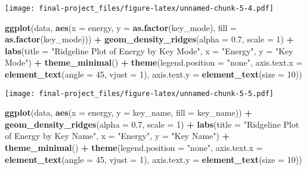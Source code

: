 \documentclass[
]{article}
\newenvironment{Shaded}{\begin{snugshade}}{\end{snugshade}}
\newcommand{\AttributeTok}[1]{\textcolor[rgb]{0.13,0.29,0.53}{#1}}
\newcommand{\DecValTok}[1]{\textcolor[rgb]{0.00,0.00,0.81}{#1}}
\newcommand{\FloatTok}[1]{\textcolor[rgb]{0.00,0.00,0.81}{#1}}
\newcommand{\FunctionTok}[1]{\textcolor[rgb]{0.13,0.29,0.53}{\textbf{#1}}}
\newcommand{\NormalTok}[1]{#1}
\newcommand{\SpecialCharTok}[1]{\textcolor[rgb]{0.81,0.36,0.00}{\textbf{#1}}}
\newcommand{\StringTok}[1]{\textcolor[rgb]{0.31,0.60,0.02}{#1}}
\begin{document}
\texttt{[image: final-project\_files/figure-latex/unnamed-chunk-5-4.pdf]}

\begin{Shaded}
\begin{Highlighting}[]
\FunctionTok{ggplot}\NormalTok{(data, }\FunctionTok{aes}\NormalTok{(}\AttributeTok{x =}\NormalTok{ energy, }\AttributeTok{y =} \FunctionTok{as.factor}\NormalTok{(key\_mode), }\AttributeTok{fill =} \FunctionTok{as.factor}\NormalTok{(key\_mode))) }\SpecialCharTok{+}
  \FunctionTok{geom\_density\_ridges}\NormalTok{(}\AttributeTok{alpha =} \FloatTok{0.7}\NormalTok{, }\AttributeTok{scale =} \DecValTok{1}\NormalTok{) }\SpecialCharTok{+}
  \FunctionTok{labs}\NormalTok{(}\AttributeTok{title =} \StringTok{"Ridgeline Plot of Energy by Key Mode"}\NormalTok{,}
       \AttributeTok{x =} \StringTok{"Energy"}\NormalTok{,}
       \AttributeTok{y =} \StringTok{"Key Mode"}\NormalTok{) }\SpecialCharTok{+}
  \FunctionTok{theme\_minimal}\NormalTok{() }\SpecialCharTok{+}
  \FunctionTok{theme}\NormalTok{(}\AttributeTok{legend.position =} \StringTok{"none"}\NormalTok{, }
        \AttributeTok{axis.text.x =} \FunctionTok{element\_text}\NormalTok{(}\AttributeTok{angle =} \DecValTok{45}\NormalTok{, }\AttributeTok{vjust =} \DecValTok{1}\NormalTok{),}
        \AttributeTok{axis.text.y =} \FunctionTok{element\_text}\NormalTok{(}\AttributeTok{size =} \DecValTok{10}\NormalTok{))}
\end{Highlighting}
\end{Shaded}

\texttt{[image: final-project\_files/figure-latex/unnamed-chunk-5-5.pdf]}

\begin{Shaded}
\begin{Highlighting}[]
\FunctionTok{ggplot}\NormalTok{(data, }\FunctionTok{aes}\NormalTok{(}\AttributeTok{x =}\NormalTok{ energy, }\AttributeTok{y =}\NormalTok{ key\_name, }\AttributeTok{fill =}\NormalTok{ key\_name)) }\SpecialCharTok{+}
  \FunctionTok{geom\_density\_ridges}\NormalTok{(}\AttributeTok{alpha =} \FloatTok{0.7}\NormalTok{, }\AttributeTok{scale =} \DecValTok{1}\NormalTok{) }\SpecialCharTok{+}
  \FunctionTok{labs}\NormalTok{(}\AttributeTok{title =} \StringTok{"Ridgeline Plot of Energy by Key Name"}\NormalTok{,}
       \AttributeTok{x =} \StringTok{"Energy"}\NormalTok{,}
       \AttributeTok{y =} \StringTok{"Key Name"}\NormalTok{) }\SpecialCharTok{+}
  \FunctionTok{theme\_minimal}\NormalTok{() }\SpecialCharTok{+}
  \FunctionTok{theme}\NormalTok{(}\AttributeTok{legend.position =} \StringTok{"none"}\NormalTok{, }
        \AttributeTok{axis.text.x =} \FunctionTok{element\_text}\NormalTok{(}\AttributeTok{angle =} \DecValTok{45}\NormalTok{, }\AttributeTok{vjust =} \DecValTok{1}\NormalTok{),}
        \AttributeTok{axis.text.y =} \FunctionTok{element\_text}\NormalTok{(}\AttributeTok{size =} \DecValTok{10}\NormalTok{))}
\end{Highlighting}
\end{Shaded}
\end{document}
